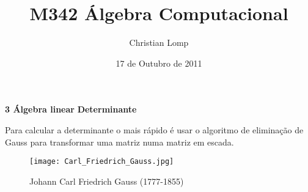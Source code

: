 \documentclass{beamer}
\title[M342]{M342 Álgebra Computacional}
\author{Christian Lomp}
\institute{FCUP}
\date{17 de Outubro de 2011}
\begin{document}
\begin{frame}
\titlepage
\end{frame}







\begin{frame}{\bf 3  Álgebra linear }{\bf Determinante}


Para calcular a determinante o mais rápido é usar o algoritmo de eliminação de Gauss para transformar uma matriz numa matriz em escada.


\begin{figure}[h]
  \begin{center}
    \texttt{[image: Carl\_Friedrich\_Gauss.jpg]}
  \end{center}

  \caption*{Johann Carl Friedrich Gauss (1777-1855)}
  \label{demTP}
\end{figure}

\end{frame}
\end{document}
